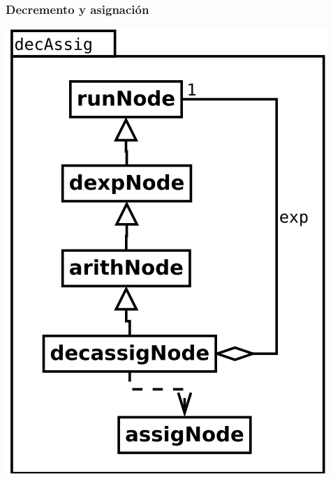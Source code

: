 \subsubsection {Decremento y asignación}
\begin{center}
\includegraphics[scale=0.4]{decAssig.png} \\
\end{center}

